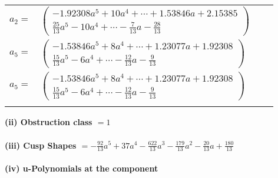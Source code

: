 \documentclass[1p]{elsarticle_modified}
\theoremstyle{definition}
\begin{document}
\begin{tabular}{m{7pt} m{180pt} m{7pt} m{180pt} }
\flushright $a_{2}=$&$\begin{pmatrix}-1.92308 a^{5}+10 a^{4}+\cdots+1.53846 a+2.15385\\\frac{25}{13} a^5-10 a^4+\cdots-\frac{7}{13} a-\frac{28}{13}\end{pmatrix}$ \\
\flushright $a_{5}=$&$\begin{pmatrix}-1.53846 a^{5}+8 a^{4}+\cdots+1.23077 a+1.92308\\\frac{15}{13} a^5-6 a^4+\cdots-\frac{12}{13} a-\frac{9}{13}\end{pmatrix}$\\ \flushright $a_{5}=$&$\begin{pmatrix}-1.53846 a^{5}+8 a^{4}+\cdots+1.23077 a+1.92308\\\frac{15}{13} a^5-6 a^4+\cdots-\frac{12}{13} a-\frac{9}{13}\end{pmatrix}$\\&\end{tabular}
\flushleft \textbf{(ii) Obstruction class $= 1$}\\~\\
\flushleft \textbf{(iii) Cusp Shapes $= -\frac{92}{13} a^5+37 a^4-\frac{622}{13} a^3-\frac{179}{13} a^2-\frac{20}{13} a+\frac{180}{13}$}\\~\\
\newpage\renewcommand{\arraystretch}{1}
\flushleft \textbf{(iv) u-Polynomials at the component}\newline \\
\end{document}
